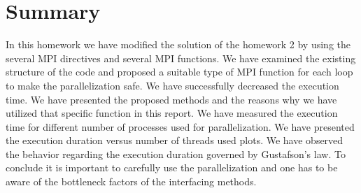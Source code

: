 \section{Summary}
In this homework we have modified the solution of the homework 2 by using the several MPI directives and several MPI functions. We have examined the existing structure of the code and proposed a suitable type of MPI function for each loop to make the parallelization safe. We have successfully decreased the execution time. We have presented the proposed methods and the reasons why we have utilized that specific function in this report. We have measured the execution time for different number of processes used for parallelization. We have presented the execution duration versus number of threads used plots. We have observed the behavior regarding the execution duration governed by Gustafson's law. To conclude it is important to carefully use the parallelization and one has to be aware of the bottleneck factors of the interfacing methods.